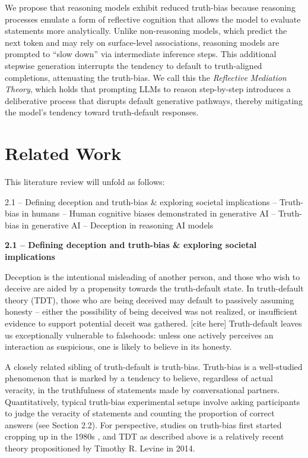 \documentclass{article}
\begin{document}
We propose that reasoning models exhibit reduced truth-bias because reasoning processes emulate a form of reflective cognition that allows the model to evaluate statements more analytically. Unlike non-reasoning models, which predict the next token and may rely on surface-level associations, reasoning models are prompted to ``slow down'' via intermediate inference steps. This additional stepwise generation interrupts the tendency to default to truth-aligned completions, attenuating the truth-bias. We call this the \textit{Reflective Mediation Theory}, which holds that prompting LLMs to reason step-by-step introduces a deliberative process that disrupts default generative pathways, thereby mitigating the model’s tendency toward truth-default responses.

\section{Related Work}

This literature review will unfold as follows:

2.1 – Defining deception and truth-bias \& exploring societal implications  – Truth-bias in humans  – Human cognitive biases demonstrated in generative AI  – Truth-bias in generative AI  – Deception in reasoning AI models \newline

\textbf{2.1 – Defining deception and truth-bias \& exploring societal implications}

Deception is the intentional misleading of another person, and those who wish to deceive are aided by a propensity towards the truth-default state. In truth-default theory (TDT), those who are being deceived may default to passively assuming honesty – either the possibility of being deceived was not realized, or insufficient evidence to support potential deceit was gathered. [cite here] Truth-default leaves us exceptionally vulnerable to falsehoods: unless one actively perceives an interaction as suspicious, one is likely to believe in its honesty.

A closely related sibling of truth-default is truth-bias. Truth-bias is a well-studied phenomenon that is marked by a tendency to believe, regardless of actual veracity, in the truthfulness of statements made by conversational partners. Quantitatively, typical truth-bias experimental setups involve asking participants to judge the veracity of statements and counting the proportion of correct answers (see Section 2.2). For perspective, studies on truth-bias first started cropping up in the 1980s \citep{mccornack_deception_1986}, and TDT as described above is a relatively recent theory propositioned by Timothy R. Levine in 2014. 
\end{document}
